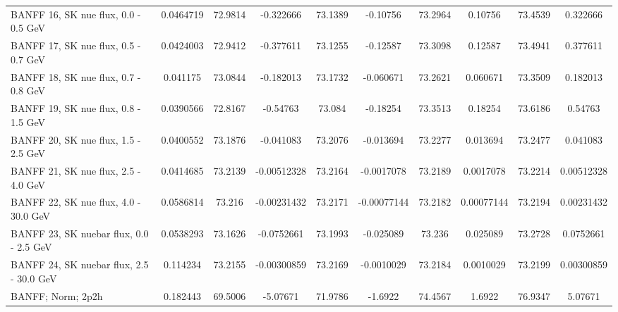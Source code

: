 \begin{tabular}{| l | S | S  S | S  S | S  S | S  S | }
                                            BANFF 16, SK nue flux, 0.0 - 0.5 GeV &       0.0464719 &         72.9814 &       -0.322666 &         73.1389 &        -0.10756 &         73.2964 &         0.10756 &         73.4539 &        0.322666 \\ 
                                            BANFF 17, SK nue flux, 0.5 - 0.7 GeV &       0.0424003 &         72.9412 &       -0.377611 &         73.1255 &        -0.12587 &         73.3098 &         0.12587 &         73.4941 &        0.377611 \\ 
                                            BANFF 18, SK nue flux, 0.7 - 0.8 GeV &        0.041175 &         73.0844 &       -0.182013 &         73.1732 &       -0.060671 &         73.2621 &        0.060671 &         73.3509 &        0.182013 \\ 
                                            BANFF 19, SK nue flux, 0.8 - 1.5 GeV &       0.0390566 &         72.8167 &        -0.54763 &          73.084 &        -0.18254 &         73.3513 &         0.18254 &         73.6186 &         0.54763 \\ 
                                            BANFF 20, SK nue flux, 1.5 - 2.5 GeV &       0.0400552 &         73.1876 &       -0.041083 &         73.2076 &       -0.013694 &         73.2277 &        0.013694 &         73.2477 &        0.041083 \\ 
                                            BANFF 21, SK nue flux, 2.5 - 4.0 GeV &       0.0414685 &         73.2139 &     -0.00512328 &         73.2164 &      -0.0017078 &         73.2189 &       0.0017078 &         73.2214 &      0.00512328 \\ 
                                           BANFF 22, SK nue flux, 4.0 - 30.0 GeV &       0.0586814 &          73.216 &     -0.00231432 &         73.2171 &     -0.00077144 &         73.2182 &      0.00077144 &         73.2194 &      0.00231432 \\ 
                                         BANFF 23, SK nuebar flux, 0.0 - 2.5 GeV &       0.0538293 &         73.1626 &      -0.0752661 &         73.1993 &       -0.025089 &          73.236 &        0.025089 &         73.2728 &       0.0752661 \\ 
                                        BANFF 24, SK nuebar flux, 2.5 - 30.0 GeV &        0.114234 &         73.2155 &     -0.00300859 &         73.2169 &      -0.0010029 &         73.2184 &       0.0010029 &         73.2199 &      0.00300859 \\ 
                                                               BANFF; Norm; 2p2h &        0.182443 &         69.5006 &        -5.07671 &         71.9786 &         -1.6922 &         74.4567 &          1.6922 &         76.9347 &         5.07671 \\ 

\end{tabular}
